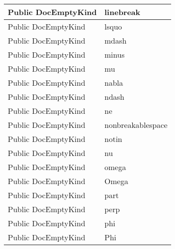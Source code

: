 \documentclass[11pt, oneside, a4paper]{book}
\begin{document}
\begin{center}
\begin{tabular}{| p{3cm} | p{12cm} | }
\hline
 Public  DocEmptyKind &  linebreak\hypertarget{SoftwareEngineeringTools.{}Documentation.{}DocEmptyKind.{}linebreak}{}\\
\hline
 Public  DocEmptyKind &  lsquo\hypertarget{SoftwareEngineeringTools.{}Documentation.{}DocEmptyKind.{}lsquo}{}\\
\hline
 Public  DocEmptyKind &  mdash\hypertarget{SoftwareEngineeringTools.{}Documentation.{}DocEmptyKind.{}mdash}{}\\
\hline
 Public  DocEmptyKind &  minus\hypertarget{SoftwareEngineeringTools.{}Documentation.{}DocEmptyKind.{}minus}{}\\
\hline
 Public  DocEmptyKind &  mu\hypertarget{SoftwareEngineeringTools.{}Documentation.{}DocEmptyKind.{}mu}{}\\
\hline
 Public  DocEmptyKind &  nabla\hypertarget{SoftwareEngineeringTools.{}Documentation.{}DocEmptyKind.{}nabla}{}\\
\hline
 Public  DocEmptyKind &  ndash\hypertarget{SoftwareEngineeringTools.{}Documentation.{}DocEmptyKind.{}ndash}{}\\
\hline
 Public  DocEmptyKind &  ne\hypertarget{SoftwareEngineeringTools.{}Documentation.{}DocEmptyKind.{}ne}{}\\
\hline
 Public  DocEmptyKind &  nonbreakablespace\hypertarget{SoftwareEngineeringTools.{}Documentation.{}DocEmptyKind.{}nonbreakablespace}{}\\
\hline
 Public  DocEmptyKind &  notin\hypertarget{SoftwareEngineeringTools.{}Documentation.{}DocEmptyKind.{}notin}{}\\
\hline
 Public  DocEmptyKind &  nu\hypertarget{SoftwareEngineeringTools.{}Documentation.{}DocEmptyKind.{}nu}{}\\
\hline
 Public  DocEmptyKind &  omega\hypertarget{SoftwareEngineeringTools.{}Documentation.{}DocEmptyKind.{}omega}{}\\
\hline
 Public  DocEmptyKind &  Omega\hypertarget{SoftwareEngineeringTools.{}Documentation.{}DocEmptyKind.{}Omega}{}\\
\hline
 Public  DocEmptyKind &  part\hypertarget{SoftwareEngineeringTools.{}Documentation.{}DocEmptyKind.{}part}{}\\
\hline
 Public  DocEmptyKind &  perp\hypertarget{SoftwareEngineeringTools.{}Documentation.{}DocEmptyKind.{}perp}{}\\
\hline
 Public  DocEmptyKind &  phi\hypertarget{SoftwareEngineeringTools.{}Documentation.{}DocEmptyKind.{}phi}{}\\
\hline
 Public  DocEmptyKind &  Phi\hypertarget{SoftwareEngineeringTools.{}Documentation.{}DocEmptyKind.{}Phi}{}\\

\end{tabular}
\end{center}
\end{document}
